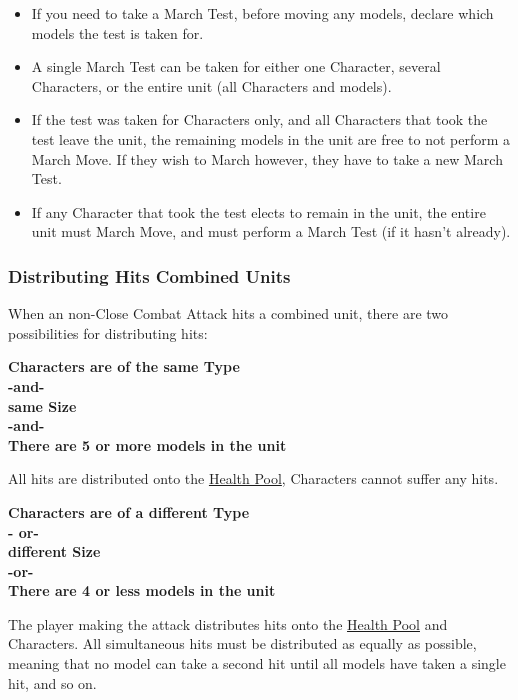 \begin{itemize}[label={-}]
\item If you need to take a March Test, before moving any models, declare which models the test is taken for.
\item A single March Test can be taken for either one Character, several Characters, or the entire unit (all Characters and \rnf{} models).
\item If the test was taken for Characters only, and all Characters that took the test leave the unit, the remaining models in the unit are free to not perform a March Move. If they wish to March however, they have to take a new March Test.
\item If any Character that took the test elects to remain in the unit, the entire unit must March Move, and must perform a March Test (if it hasn't already).
\end{itemize}

\subsubsection{Distributing Hits  Combined Units}

When an non-Close Combat Attack hits a combined unit, there are two possibilities for distributing hits:

\vspace*{10pt}
\begin{minipage}[t]{0.42\textwidth}
  \begin{center}
    \textbf{%
    Characters are of the same Type\\%
    -and-\\%
    same Size\\%
    -and-\\%
    There are 5 or more \rnf{} models in the unit%
    }
  \end{center}
  
  \vspace*{10pt}
  All hits are distributed onto the \rnf{} \hyperref[health_pools]{Health Pool}, Characters cannot suffer any hits.
\end{minipage}%
\hfill%
\begin{minipage}[t]{0.42\textwidth}
  \begin{center}
    \textbf{%
      Characters are of a different Type\\%
      - or-\\%
      different Size\\%
      -or-\\%
      There are 4 or less \rnf{} models in the unit%
    }
  \end{center}
   \vspace*{10pt} 
  The player making the attack distributes hits onto the \rnf{} \hyperref[health_pools]{Health Pool} and Characters. All simultaneous hits must be distributed as equally as possible, meaning that no model can take a second hit until all models have taken a single hit, and so on.
\end{minipage}

